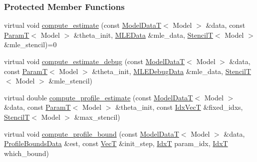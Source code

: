 \subsubsection*{Protected Member Functions}
\begin{DoxyCompactItemize}
\item 
virtual void \hyperlink{classmappel_1_1estimator_1_1Estimator_ac0ea02d936ebc25149d521c37665bfa6}{compute\+\_\+estimate} (const \hyperlink{namespacemappel_a97f050df953605381ae9c901c3b125f1}{Model\+DataT}$<$ Model $>$ \&data, const \hyperlink{namespacemappel_a667925cb0d6c0e49f2f035cc5a9a6857}{ParamT}$<$ Model $>$ \&theta\+\_\+init, \hyperlink{namespacemappel_1_1estimator_structmappel_1_1estimator_1_1MLEData}{M\+L\+E\+Data} \&mle\+\_\+data, \hyperlink{namespacemappel_a3a06598240007876f8c4bf834ad86197}{StencilT}$<$ Model $>$ \&mle\+\_\+stencil)=0
\item 
virtual void \hyperlink{classmappel_1_1estimator_1_1Estimator_a59710205cc6b04fe84b171d9bc4b5d1c}{compute\+\_\+estimate\+\_\+debug} (const \hyperlink{namespacemappel_a97f050df953605381ae9c901c3b125f1}{Model\+DataT}$<$ Model $>$ \&data, const \hyperlink{namespacemappel_a667925cb0d6c0e49f2f035cc5a9a6857}{ParamT}$<$ Model $>$ \&theta\+\_\+init, \hyperlink{namespacemappel_1_1estimator_structmappel_1_1estimator_1_1MLEDebugData}{M\+L\+E\+Debug\+Data} \&mle\+\_\+data, \hyperlink{namespacemappel_a3a06598240007876f8c4bf834ad86197}{StencilT}$<$ Model $>$ \&mle\+\_\+stencil)
\item 
virtual double \hyperlink{classmappel_1_1estimator_1_1Estimator_a99486218b65fb20baa8af8234fc9f10a}{compute\+\_\+profile\+\_\+estimate} (const \hyperlink{namespacemappel_a97f050df953605381ae9c901c3b125f1}{Model\+DataT}$<$ Model $>$ \&data, const \hyperlink{namespacemappel_a667925cb0d6c0e49f2f035cc5a9a6857}{ParamT}$<$ Model $>$ \&theta\+\_\+init, const \hyperlink{namespacemappel_ac63743dcd42180127307cd0e4ecdd784}{Idx\+VecT} \&fixed\+\_\+idxs, \hyperlink{namespacemappel_a3a06598240007876f8c4bf834ad86197}{StencilT}$<$ Model $>$ \&max\+\_\+stencil)
\item 
virtual void \hyperlink{classmappel_1_1estimator_1_1Estimator_a83f877d399368dee1f10cc905d833a85}{compute\+\_\+profile\+\_\+bound} (const \hyperlink{namespacemappel_a97f050df953605381ae9c901c3b125f1}{Model\+DataT}$<$ Model $>$ \&data, \hyperlink{structmappel_1_1estimator_1_1ProfileBoundsData}{Profile\+Bounds\+Data} \&est, const \hyperlink{namespacemappel_a2225ad69f358daa3f4f99282a35b9a3a}{VecT} \&init\+\_\+step, \hyperlink{namespacemappel_ab17ec0f30b61ece292439d7ece81d3a8}{IdxT} param\+\_\+idx, \hyperlink{namespacemappel_ab17ec0f30b61ece292439d7ece81d3a8}{IdxT} which\+\_\+bound)

\end{DoxyCompactItemize}
